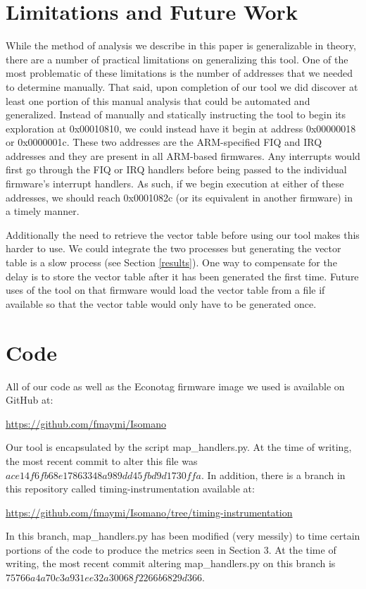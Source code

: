 \documentclass[letterpaper, 10 pt, conference]{ieeeconf}
\begin{document}
\section{Limitations and Future Work} \label{limits}
While the method of analysis we describe in this paper is generalizable in theory, there are a number of practical limitations on generalizing this tool. One of the most problematic of these limitations is the number of addresses that we needed to determine manually. That said, upon completion of our tool we did discover at least one portion of this manual analysis that could be automated and generalized. Instead of manually and statically instructing the tool to begin its exploration at 0x00010810, we could instead have it begin at address 0x00000018 or 0x0000001c. These two addresses are the ARM-specified FIQ and IRQ addresses and they are present in all ARM-based firmwares. Any interrupts would first go through the FIQ or IRQ handlers before being passed to the individual firmware’s interrupt handlers. As such, if we begin execution at either of these addresses, we should reach 0x0001082c (or its equivalent in another firmware) in a timely manner. 

Additionally the need to retrieve the vector table before using our tool makes this harder to use. We could integrate the two processes but generating the vector table is a slow process (see Section \ref{results}). One way to compensate for the delay is to store the vector table after it has been generated the first time. Future uses of the tool on that firmware would load the vector table from a file if available so that the vector table would only have to be generated once.

\section{Code}
All of our code as well as the Econotag firmware image we used is available on GitHub at:

\url{https://github.com/fmaymi/Isomano}

Our tool is encapsulated by the script map\_handlers.py. At the time of writing, the most recent commit to alter this file was $ace14f6fb68e17863348a989dd45fbd9d1730ffa$. In addition, there is a branch in this repository called timing-instrumentation available at: 

\url{https://github.com/fmaymi/Isomano/tree/timing-instrumentation}

In this branch, map\_handlers.py has been modified (very messily) to time certain portions of the code to produce the metrics seen in Section 3. At the time of writing, the most recent commit altering map\_handlers.py on this branch is $75766a4a70c3a931ee32a30068f2266b6829d366$.
\end{document}
